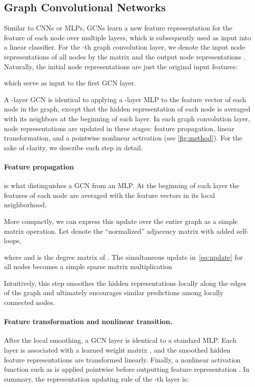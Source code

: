 \documentclass{article}
\begin{document}
\subsection{Graph Convolutional Networks}
Similar to CNNs or MLPs, GCNs  learn a new feature representation for the feature  of each node over multiple layers, which is subsequently used as input into a linear classifier.  For the -th graph convolution layer, we denote the input node representations of all nodes by the matrix   and the output node representations . Naturally, the initial node representations are just the original input features: 

which serve as input to the first GCN layer. 

A -layer GCN is identical to applying a -layer MLP to the feature vector  of each node in the graph, except that the hidden representation of each node is averaged with its neighbors at the beginning of each layer. In each graph convolution layer, node representations are updated in three stages: feature propagation, linear transformation, and a pointwise nonlinear activation (see \autoref{fig:method}). For the sake of clarity, we describe each step in detail. 


\paragraph{Feature propagation} is what distinguishes a GCN from an MLP. 
At the beginning of each layer the features  of each node  are averaged with  the feature vectors  in its local neighborhood, 

More compactly, we can express this update over the entire graph as a simple matrix operation.  Let  denote the ``normalized'' adjacency matrix with added self-loops, 

where  and  is the degree matrix of . The simultaneous update in~\autoref{eq:update} for all nodes becomes a simple sparse matrix multiplication

Intuitively, this step smoothes the hidden representations locally along the edges of the graph and ultimately encourages similar predictions among locally connected nodes.


\paragraph{Feature transformation and nonlinear transition.} 
After the local smoothing, a GCN layer is identical to a standard MLP.  Each layer is associated with a learned weight matrix , and the smoothed hidden feature representations are transformed linearly. 
Finally, a nonlinear activation function such as  is applied pointwise before outputting feature representation . In summary, the representation updating rule of the -th layer is: 
\end{document}
